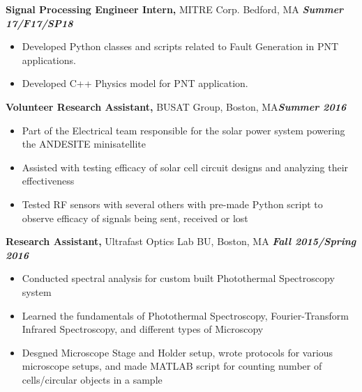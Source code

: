 \documentclass[margin]{res}
\begin{document}
\begin{resume}
 {\bf Signal Processing Engineer Intern,} MITRE Corp. Bedford, MA \hfill \textbf{\textit{Summer 17/F17/SP18}}
 \begin{itemize}  pt  %
 \item Developed Python classes and scripts related to Fault Generation in PNT applications.
 \item Developed C++ Physics model for PNT application.
 \end{itemize}

 
 
{\bf Volunteer Research Assistant,} BUSAT Group, Boston, MA\hfill  \textbf{\textit{Summer 2016}}
\begin{itemize} \itemsep -0.1pt %
\item Part of the Electrical team responsible for the solar power system powering the ANDESITE minisatellite
\item Assisted with testing efficacy of solar cell circuit designs and analyzing their effectiveness 
\item Tested RF sensors with several others with pre-made Python script to observe efficacy of signals being sent, received or lost
\end{itemize}


{\bf Research Assistant,} Ultrafast Optics Lab BU, Boston, MA \hfill \textbf{\textit{Fall 2015/Spring 2016}}
			\begin{itemize} \itemsep -2pt
			\item  Conducted spectral analysis for custom built Photothermal Spectroscopy system
			\item Learned the fundamentals of Photothermal Spectroscopy, Fourier-Transform Infrared Spectroscopy, and different types of Microscopy 
			\item Desgned Microscope Stage and Holder setup, wrote protocols for various microscope setups, and made MATLAB script for counting number of cells/circular objects in a sample
			\end{itemize}
			

\end{resume}
\end{document}
